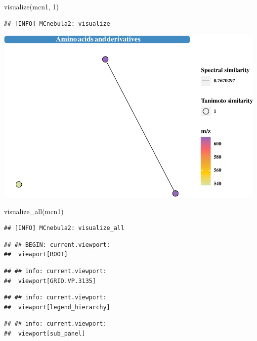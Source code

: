 \documentclass[
]{article}
\newenvironment{Shaded}{\begin{snugshade}}{\end{snugshade}}
\newcommand{\DecValTok}[1]{\textcolor[rgb]{0.00,0.00,0.81}{#1}}
\newcommand{\FunctionTok}[1]{\textcolor[rgb]{0.00,0.00,0.00}{#1}}
\newcommand{\NormalTok}[1]{#1}
\begin{document}
\begin{Shaded}
\begin{Highlighting}[]
\FunctionTok{visualize}\NormalTok{(mcn1, }\DecValTok{1}\NormalTok{)}
\end{Highlighting}
\end{Shaded}

\begin{verbatim}
## [INFO] MCnebula2: visualize
\end{verbatim}

\includegraphics{Rtips2_files/figure-latex/unnamed-chunk-12-2.pdf}

\begin{Shaded}
\begin{Highlighting}[]
\FunctionTok{visualize\_all}\NormalTok{(mcn1)}
\end{Highlighting}
\end{Shaded}

\begin{verbatim}
## [INFO] MCnebula2: visualize_all
\end{verbatim}

\begin{verbatim}
## ## BEGIN: current.viewport: 
##  viewport[ROOT]
\end{verbatim}

\begin{verbatim}
## ## info: current.viewport: 
##  viewport[GRID.VP.3135]
\end{verbatim}

\begin{verbatim}
## ## info: current.viewport: 
##  viewport[legend_hierarchy]
\end{verbatim}

\begin{verbatim}
## ## info: current.viewport: 
##  viewport[sub_panel]
\end{verbatim}
\end{document}
